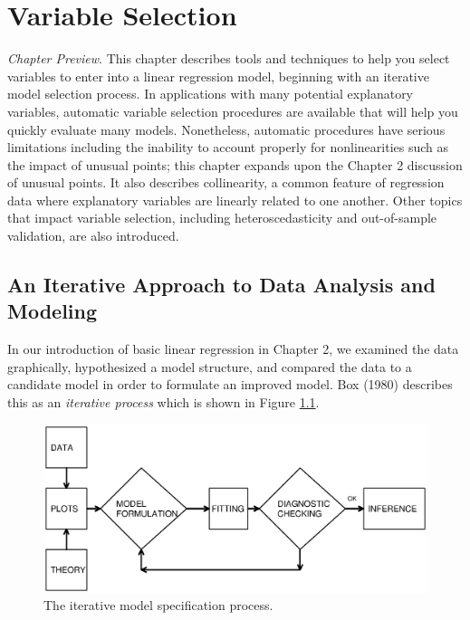 \setcounter{chapter}{4}

\chapter{Variable Selection}

{\small \textit{Chapter Preview}. This chapter describes tools and
techniques to help you select variables to enter into a linear
regression model, beginning with an iterative model selection
process. In applications with many potential explanatory variables,
automatic variable selection procedures are available that will help
you quickly evaluate many models. Nonetheless, automatic procedures
have serious limitations including the inability to account properly
for nonlinearities such as the impact of unusual points; this
chapter expands upon the Chapter 2 discussion of unusual points. It
also describes collinearity, a common feature of regression data
where explanatory variables are linearly related to one another.
Other topics that impact variable selection, including
heteroscedasticity and out-of-sample validation, are also
introduced.}

\section{An Iterative Approach to Data Analysis and
Modeling}\label{S5:Iterative}

In our introduction of basic linear regression in Chapter 2, we
examined the data graphically, hypothesized a model structure, and
compared the data to a candidate model in order to formulate an
improved model. Box (1980) describes this as an \emph{iterative
process} which is shown in Figure \ref{F5:Iterative}.


\begin{figure}[htp]
    \includegraphics[width=1\textwidth]{Chapter5/F5Iterative.eps}
   \caption{\label{F5:Iterative} \small The iterative model specification process.}
\end{figure}

